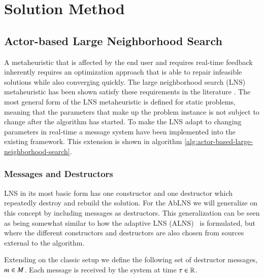 \section{Solution Method}
\label{sec:2-solution-method}

\subsection{Actor-based Large Neighborhood Search}
A metaheuristic that is affected by the end user and requires real-time feedback
inherently requires an optimization approach that is able to repair infeasible solutions
while also converging quickly. The large neighborhood search (LNS)~\cite{shaw1998using}
metaheuristic has been shown satisfy these requirements in the literature
\cite{gendreauHandbookMetaheuristics2019}. The most general form of the LNS metaheuristic
is defined for static problems, meaning that the parameters that make up the problem instance
is not subject to change after the algorithm has started. To make the
LNS adapt to changing parameters in real-time a message system have been
implemented into the existing framework. This  extension is shown in algorithm
\ref{alg:actor-based-large-neighborhood-search}.

\subsubsection{Messages and Destructors}
LNS in its most basic form has one constructor and one destructor which
repeatedly destroy and rebuild the solution. For the AbLNS we will generalize
on this concept by including messages as destructors. This generalization can
be seen as being somewhat similar to how
the adaptive LNS (ALNS)~\cite{pisinger2007general} is formulated, but where the different constructors and
destructors are also chosen from sources external to the algorithm.

Extending on the classic setup we define the following set of 
destructor messages, $m_{}^{} \in M$. Each
message is received by the system at time $\tau \in \mathbb{R}$.

